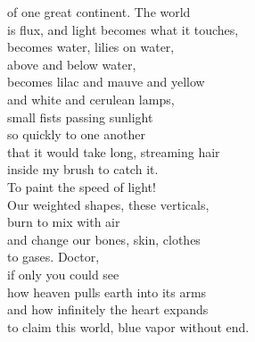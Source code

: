\begin{Parallel}{0.48\textwidth}{0.48\textwidth}
{of one great continent. The world\\
is flux, and light becomes what it touches,\\
becomes water, lilies on water,\\
above and below water,\\
becomes lilac and mauve and yellow\\
and white and cerulean lamps,\\
small fists passing sunlight\\
so quickly to one another\\
that it would take long, streaming hair\\
inside my brush to catch it.\\
To paint the speed of light!\\
Our weighted shapes, these verticals,\\
burn to mix with air\\
and change our bones, skin, clothes\\
to gases.  Doctor,\\
if only you could see\\
how heaven pulls earth into its arms\\
and how infinitely the heart expands\\
to claim this world, blue vapor without end.}
\ParallelPar
\end{Parallel}
\vfill
\hspace{0pt}